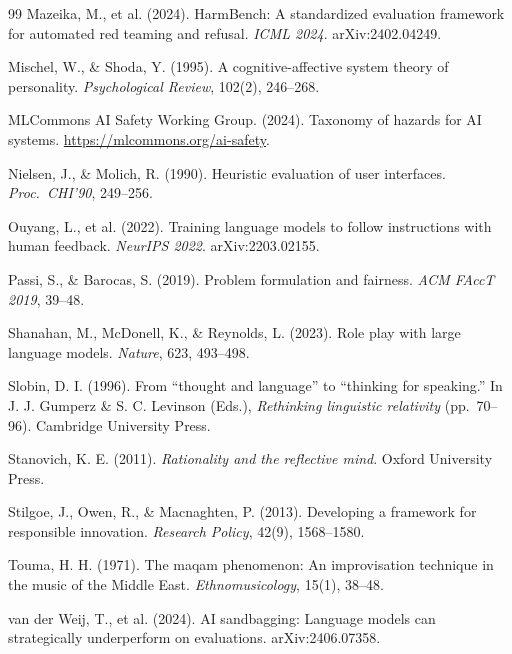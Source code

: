 \documentclass[11pt,a4paper]{article}
\begin{document}
\begin{thebibliography}{99}
Mazeika, M., et al. (2024). HarmBench: A standardized evaluation framework for automated red teaming and refusal. \textit{ICML 2024}. arXiv:2402.04249.

Mischel, W., \& Shoda, Y. (1995). A cognitive-affective system theory of personality. \textit{Psychological Review}, 102(2), 246--268.

MLCommons AI Safety Working Group. (2024). Taxonomy of hazards for AI systems. \url{https://mlcommons.org/ai-safety}.

Nielsen, J., \& Molich, R. (1990). Heuristic evaluation of user interfaces. \textit{Proc.\ CHI'90}, 249--256.

Ouyang, L., et al. (2022). Training language models to follow instructions with human feedback. \textit{NeurIPS 2022}. arXiv:2203.02155.

Passi, S., \& Barocas, S. (2019). Problem formulation and fairness. \textit{ACM FAccT 2019}, 39--48.

Shanahan, M., McDonell, K., \& Reynolds, L. (2023). Role play with large language models. \textit{Nature}, 623, 493--498.

Slobin, D. I. (1996). From ``thought and language'' to ``thinking for speaking.'' In J. J. Gumperz \& S. C. Levinson (Eds.), \textit{Rethinking linguistic relativity} (pp.\ 70--96). Cambridge University Press.

Stanovich, K. E. (2011). \textit{Rationality and the reflective mind}. Oxford University Press.

Stilgoe, J., Owen, R., \& Macnaghten, P. (2013). Developing a framework for responsible innovation. \textit{Research Policy}, 42(9), 1568--1580.

Touma, H. H. (1971). The maqam phenomenon: An improvisation technique in the music of the Middle East. \textit{Ethnomusicology}, 15(1), 38--48.

van der Weij, T., et al. (2024). AI sandbagging: Language models can strategically underperform on evaluations. arXiv:2406.07358.


\end{thebibliography}
\end{document}
